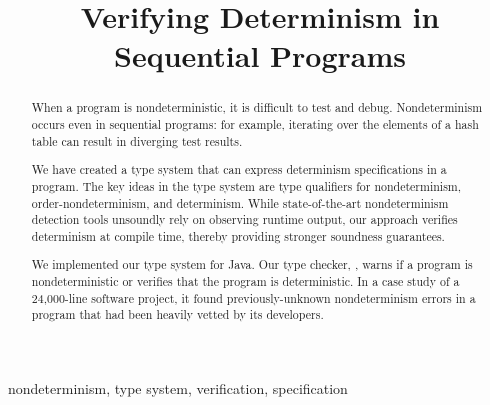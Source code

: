 \documentclass[conference,keeplastbox]{IEEEtran}
\begin{document}
\title{Verifying Determinism in Sequential Programs}

\author{
}

\maketitle

\begin{abstract}
When a program is nondeterministic, it is difficult to test and debug.
Nondeterminism occurs even in sequential programs: for example, 
iterating over the elements of a hash table can result in diverging test results.

We have created a type system that can express determinism specifications
in a program.
The key ideas in the type system are type qualifiers for nondeterminism,
order-nondeterminism, and determinism. While state-of-the-art
nondeterminism detection tools unsoundly rely on observing runtime output, our approach
verifies determinism at compile time, thereby providing stronger soundness guarantees.

We implemented our type system for Java.
Our type checker, \theDeterminismChecker, warns if a
program is nondeterministic or verifies that the program is deterministic.
In a case study of a 24,000-line software project, it found
previously-unknown nondeterminism errors in a program that had been heavily
vetted by its developers.
\end{abstract}

\begin{IEEEkeywords}
nondeterminism, type system, verification, specification
\end{IEEEkeywords}








\end{document}
